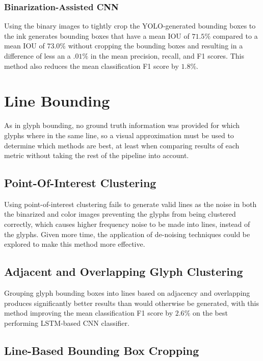 \subsubsection{Binarization-Assisted CNN}

Using the binary images to tightly crop the YOLO-generated bounding boxes to the ink generates bounding boxes that have a mean IOU of $71.5\%$ compared to a mean IOU of $73.0\%$ without cropping the bounding boxes and resulting in a difference of less an a $.01\%$ in the mean precision, recall, and F1 scores. This method also reduces the mean classification F1 score by $1.8\%$.

\section{Line Bounding}

As in glyph bounding, no ground truth information was provided for which glyphs where in the same line, so a visual approximation must be used to determine which methods are best, at least when comparing results of each metric without taking the rest of the pipeline into account.

\subsection{Point-Of-Interest Clustering}

Using point-of-interest clustering fails to generate valid lines as the noise in both the binarized and color images preventing the glyphs from being clustered correctly, which causes higher frequency noise to be made into lines, instead of the glyphs. Given more time, the application of de-noising techniques could be explored to make this method more effective.

\subsection{Adjacent and Overlapping Glyph Clustering}

Grouping glyph bounding boxes into lines based on adjacency and overlapping produces significantly better results than would otherwise be generated, with this method improving the mean classification F1 score by $2.6\%$ on the best performing LSTM-based CNN classifier.

\subsection{Line-Based Bounding Box Cropping}

